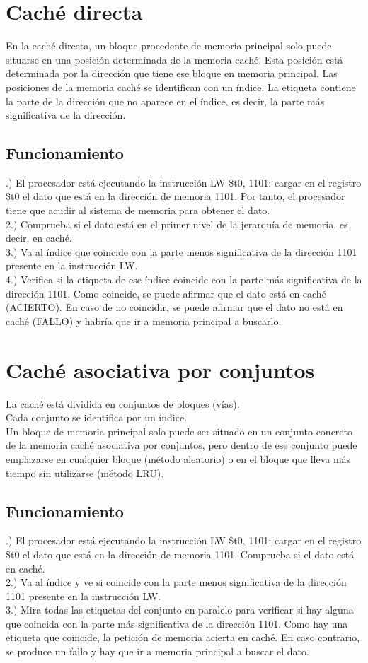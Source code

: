 \documentclass[11pt,letterpaper]{article}
\begin{document}
\section{Caché directa}
\noindent
En la caché directa, un bloque procedente de memoria principal solo puede situarse en una posición determinada de la memoria caché. Esta posición está determinada por la dirección que tiene ese bloque en memoria principal. Las posiciones de la memoria caché se identifican con un índice. La etiqueta contiene la parte de la dirección que no aparece en el índice, es decir, la parte más significativa de la dirección.
\subsection{Funcionamiento}
.) El procesador está ejecutando la instrucción LW \$t0, 1101: cargar en el registro \$t0 el dato que está en la dirección de memoria 1101. Por tanto, el procesador tiene que acudir al sistema de memoria para obtener el dato.\\
2.) Comprueba si el dato está en el primer nivel de la jerarquía de memoria, es decir, en caché.\\
3.) Va al índice que coincide con la parte menos significativa de la dirección 1101 presente en la instrucción LW.\\
4.) Verifica si la etiqueta de ese índice coincide con la parte más significativa de la dirección 1101. Como coincide, se puede afirmar que el dato está en caché (ACIERTO). En caso de no coincidir, se puede afirmar que el dato no está en caché (FALLO) y habría que ir a memoria principal a buscarlo.


\section{Caché asociativa por conjuntos}
\noindent
La caché está dividida en conjuntos de bloques (vías).\\
Cada conjunto se identifica por un índice.\\
Un bloque de memoria principal solo puede ser situado en un conjunto concreto de la memoria caché asociativa por conjuntos, pero dentro de ese conjunto puede emplazarse en cualquier bloque (método aleatorio) o en el bloque que lleva más tiempo sin utilizarse (método LRU).
\subsection{Funcionamiento}
.) El procesador está ejecutando la instrucción LW \$t0, 1101: cargar en el registro \$t0 el dato que está en la dirección de memoria 1101. Comprueba si el dato está en caché. \\
2.) Va al índice y ve si coincide con la parte menos significativa de la dirección 1101 presente en la instrucción LW. \\
3.) Mira todas las etiquetas del conjunto en paralelo para verificar si hay alguna que coincida con la parte más significativa de la dirección 1101. Como hay una etiqueta que coincide, la petición de memoria acierta en caché. En caso contrario, se produce un fallo y hay que ir a memoria principal a buscar el dato.
\end{document}
